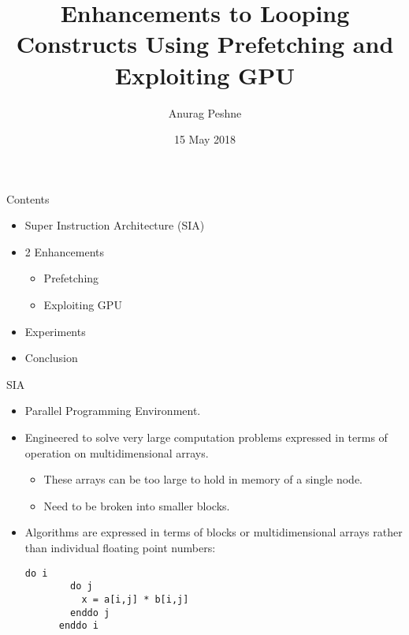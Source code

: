 \documentclass[pdf]{beamer}
\title{Enhancements to Looping Constructs Using Prefetching and Exploiting GPU}
\author{Anurag Peshne}
\date{15 May 2018}
\begin{document}
\begin{frame}
  \titlepage
\end{frame}

\begin{frame}{Contents}
  \pause
  \begin{itemize}
  \item Super Instruction Architecture (SIA)
    \pause
  \item 2 Enhancements
    \pause
    \begin{itemize}
    \item Prefetching
      \pause
    \item Exploiting GPU
      \pause
    \end{itemize}
  \item Experiments
    \pause
  \item Conclusion
  \end{itemize}
\end{frame}

\begin{frame}[fragile]{SIA}
  \begin{itemize}
    \pause
  \item Parallel Programming Environment.
    \pause
  \item Engineered to solve very large computation problems expressed in terms of
    operation on multidimensional arrays.
    \begin{itemize}
      \pause
    \item These arrays can be too large to hold in memory of a single node.
      \pause
    \item Need to be broken into smaller blocks.
    \end{itemize}
    \pause
  \item Algorithms are expressed in terms of blocks or multidimensional arrays
    rather than individual floating point numbers:
    \begin{lstlisting}[]
      do i
        do j
          x = a[i,j] * b[i,j]
        enddo j
      enddo i
    \end{lstlisting}
  \end{itemize}
\end{frame}
\end{document}
